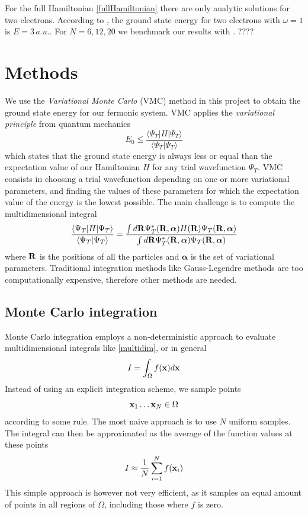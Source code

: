 \documentclass[english, a4paper]{article}
\begin{document}
\noindent For the full Hamiltonian \eqref{fullHamiltonian} there are only analytic solutions
for two electrons. According to \cite{ref1}, the ground state energy for two electrons
with $\omega = 1$ is $E = 3 \, a.u.$. For $N = 6,12,20$ we benchmark our results with \cite{ref2}. ????

\section{Methods}

We use the \textit{Variational Monte Carlo} (VMC) method in this project to obtain the ground state energy
for our fermonic system. VMC applies the \textit{variational principle} from quantum mechanics
\begin{equation}
 E_0 \leq \frac{\langle \Psi_T | H | \Psi_T \rangle}{\langle \Psi_T | \Psi_T \rangle}
\end{equation}
which states that the ground state energy is always less or equal than the expectation value of our Hamiltonian $H$
for any trial wavefunction $\Psi_T$. VMC consists in choosing a trial wavefunction depending on one or more
variational parameters, and finding the values of these parameters for which the expectation value of the 
energy is the lowest possible. The main challenge is to compute the multidimensional integral
\begin{equation}
 \frac{\langle \Psi_T | H | \Psi_T \rangle}{\langle \Psi_T | \Psi_T \rangle} = 
 \frac{\int d {\bf R} \Psi_T^*({\bf R}, \boldsymbol{\alpha}) H({\bf R}) \Psi_T({\bf R}, \boldsymbol{\alpha})}
       {\int d {\bf R} \Psi_T^*({\bf R}, \boldsymbol{\alpha}) \Psi_T({\bf R}, \boldsymbol{\alpha})}
 \label{multidim}
\end{equation}
where $\bf{R}$ is the positions of all the particles and $\boldsymbol{\alpha}$ is the set of variational parameters.
Traditional integration methods like Gauss-Legendre methods are too computationally expensive, therefore 
other methods are needed.

\subsection{Monte Carlo integration}

Monte Carlo integration employs a non-deterministic approach to evaluate multidimensional integrals like \eqref{multidim}, or
in general
\begin{equation}
 I = \int_\Omega f({\bf x}) d{\bf x}
\end{equation}
Instead of using an explicit integration scheme, we sample points
\begin{equation}
 {\bf x}_1 \dots {\bf x}_N \in \Omega
\end{equation}
according to some rule. The most naive approach is to use $N$ uniform samples. 
The integral can then be approximated as the average of the function values at these points
\begin{equation}
 I \approx \frac{1}{N} \sum_{i=1}^N f({\bf x}_i)
\end{equation}
This simple approach is however not very efficient, as it samples an equal amount of points in all regions of $\Omega$, 
including those where $f$ is zero. 
\end{document}
